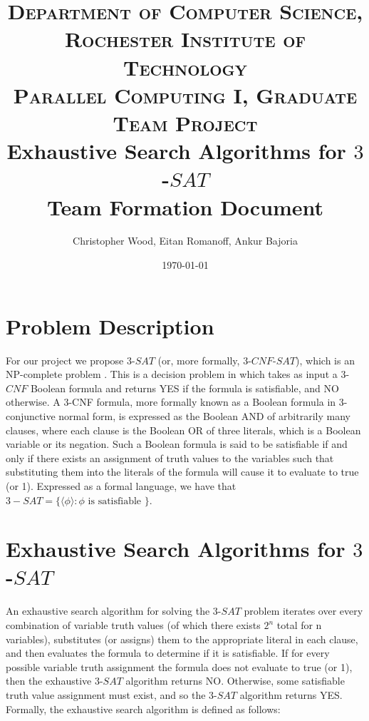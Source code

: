 \documentclass[paper=a4, fontsize=11pt]{scrartcl} %
\title{	
\normalfont \normalsize 
\textsc{Department of Computer Science, Rochester Institute of Technology} \\ %
\textsc{Parallel Computing I, Graduate Team Project} 
\horrule{2pt} \\[0.4cm] %
\huge Exhaustive Search Algorithms for $3$-$SAT$ \\ 
\Large Team Formation Document \\
\horrule{2pt}
}
\author{Christopher Wood, Eitan Romanoff, Ankur Bajoria } %
\date{\large \today} %
\begin{document}
\maketitle %

\section{Problem Description}
For our project we propose $3$-$SAT$ (or, more formally, $3$-$CNF$-$SAT$), which 
is an NP-complete problem \cite{algs}. This is a decision problem in which takes 
as input a $3$-$CNF$ Boolean formula and returns YES if the formula is 
satisfiable, and NO otherwise. A 3-CNF formula, more formally known 
as a Boolean formula in 3-conjunctive normal form, is expressed as the 
Boolean AND of arbitrarily many clauses, where each clause is the Boolean 
OR of three literals, which is a Boolean variable or its negation. Such a 
Boolean formula is said to be satisfiable if and only if there exists an 
assignment of truth values to the variables such that substituting them 
into the literals of the formula will cause it to evaluate to true (or 1). 
Expressed as a formal language, we have that $3-SAT = \{\langle \phi \rangle : \phi \text{ is satisfiable } \}$.

\section{Exhaustive Search Algorithms for $3$-$SAT$}
An exhaustive search algorithm for solving the $3$-$SAT$ problem iterates over 
every combination of variable truth values (of which there exists $2^n$ total 
for n variables), substitutes (or assigns) them to the appropriate literal in each 
clause, and then evaluates the formula to determine if it is satisfiable. If for 
every possible variable truth assignment the formula does not evaluate to 
true (or 1), then the exhaustive $3$-$SAT$ algorithm returns NO. Otherwise, 
some satisfiable truth value assignment must exist, and so the $3$-$SAT$ algorithm 
returns YES. Formally, the exhaustive search algorithm is defined as follows:
\end{document}
